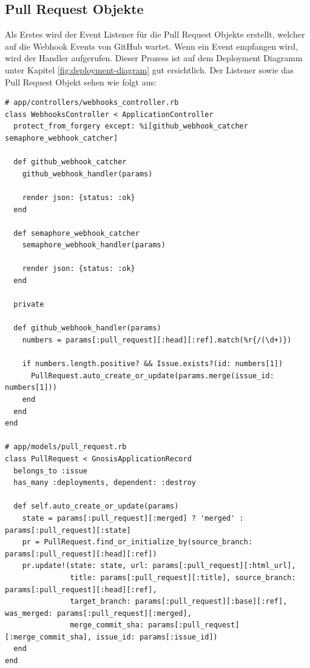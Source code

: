 \subsection{Pull Request Objekte}
Als Erstes wird der Event Listener für die Pull Request Objekte erstellt, welcher auf die Webhook Events
von GitHub wartet. Wenn ein Event empfangen wird, wird der Handler aufgerufen. Dieser Prozess ist auf dem Deployment
Diagramm unter Kapitel \ref{fig:deployment-diagram} gut ersichtlich. \newline
Der Listener sowie das Pull Request Objekt sehen wie folgt aus:
\begin{codebox}[]
  \begin{verbatim}
# app/controllers/webhooks_controller.rb
class WebhooksController < ApplicationController
  protect_from_forgery except: %i[github_webhook_catcher semaphore_webhook_catcher]

  def github_webhook_catcher
    github_webhook_handler(params)

    render json: {status: :ok}
  end

  def semaphore_webhook_catcher
    semaphore_webhook_handler(params)

    render json: {status: :ok}
  end

  private

  def github_webhook_handler(params)
    numbers = params[:pull_request][:head][:ref].match(%r{/(\d+)})

    if numbers.length.positive? && Issue.exists?(id: numbers[1])
      PullRequest.auto_create_or_update(params.merge(issue_id: numbers[1]))
    end
  end
end

# app/models/pull_request.rb
class PullRequest < GnosisApplicationRecord
  belongs_to :issue
  has_many :deployments, dependent: :destroy

  def self.auto_create_or_update(params)
    state = params[:pull_request][:merged] ? 'merged' : params[:pull_request][:state]
    pr = PullRequest.find_or_initialize_by(source_branch: params[:pull_request][:head][:ref])
    pr.update!(state: state, url: params[:pull_request][:html_url],
               title: params[:pull_request][:title], source_branch: params[:pull_request][:head][:ref],
               target_branch: params[:pull_request][:base][:ref], was_merged: params[:pull_request][:merged],
               merge_commit_sha: params[:pull_request][:merge_commit_sha], issue_id: params[:issue_id])
  end
end
  \end{verbatim}
\end{codebox}
